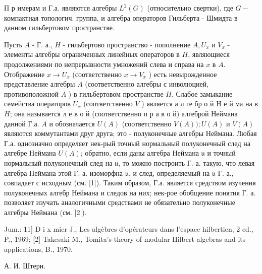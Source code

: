\documentclass[10pt]{article}
\begin{document}
П р имерам и Г.а. являются алгебры $L^{2}(G)$ (относительно свертки), где $G-$ компактная топологич. группа, и алгебра операторов Гильберта - Шмидта в данном гильбертовом пространстве.



Пусть $A$ - Г. а., $H$ - гильбертово пространство - пополнение $A, U_{x}$ и $V_{x}$ - элементы алгебры ограниченных линейных операторов в $H$, являющиеся продолжениями по непрерывности умножений слева и справа на $x$ в $A$. Отображение $x \rightarrow U_{x}$ (соответственно $x \rightarrow V_{x}$ ) есть невырожденное представление алгебры $A$ (соответственно алгебры с инволюцией, противоположной $A$ ) в гильбертовом пространстве $H$. Слабое замыкание семейства операторов $U_{x}$ (соответственно $V$ ) является а л ге бр о й $\mathrm{H}$ е й ма на в $H$; она называется л е в о й (соответственно п р а в о й) алгеброй Неймана данной Г.а. $A$ и обозначается $U(A)$ (соответственно $V(A)) ; U(A)$ и $V(A)$ являются коммутантами друг друга; это - полуконечные алгебры Неймана. Любая Г.а. однозначно определяет нек-рый точный нормальный полуконечный след на алгебре Неймана $U(A)$; обратно, если даны алгебра Неймана $\mathfrak{u}$ и точный нормальный полуконечный след на $\mathfrak{u}$, то можно построить Г. а. такую, что левая алгебра Неймана этой Г. а. изоморфна $\mathfrak{u}$, и след, определяемый на $\mathfrak{u}$ Г. а., совпадает с исходным (см. [1]). Таким образом, Г.а. является средством изучения полуконечных алгебр Неймана и следов на них; нек-рое обобщение понятия Г. а. позволяет изучать аналогичными средствами не обязательно полуконечные алгебры Неймана (см. [2|).



Jum.: 11] D i x mier J., Les algèbres d'opérateurs dans l'espace hilbertien, 2 ed., P., 1969; [2] Takesaki M., Tomita's theory of modular Hilbert algebras and its applications, B., 1970.



А. И. Штерн.
\end{document}
